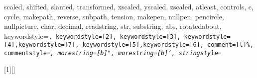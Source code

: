{{        scaled, shifted, slanted, transformed, xscaled, yscaled, zscaled,%
        atleast, controls, c, cycle, makepath, reverse, subpath, tension,%
        makepen, nullpen, pencircle, nullpicture,%
    char, decimal, readstring, str, substring, abs, rotatedabout},%
    keywordstyle=\color{mpkeyword}\tt, keywordstyle=[2]\tt\color{mpinternalconstants},%
    keywordstyle=[3]\tt\color{mpdef}, keywordstyle=[4]\tt\color{mptype},keywordstyle=[7]\tt\color{mpdef},%
    keywordstyle=[5]\tt\color{mfcmd},keywordstyle=[6]\tt\color{mpexp},%
    comment=[l]{\%},%
    commentstyle=\it\small\color{texcomment},
    morestring=[b]",
    morestring=[b]',
    stringstyle=\color{mpstring}%
}


[1][]{}{}







\makeindex



